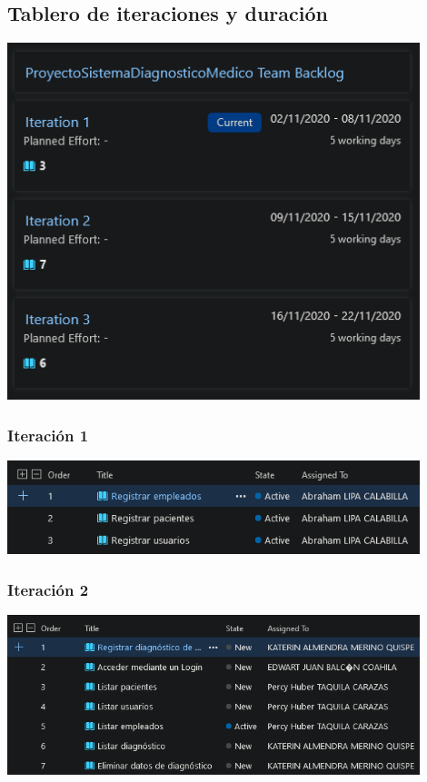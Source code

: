 \documentclass[preprint,12pt]{elsarticle}
\begin{document}
		\subsection{Tablero de iteraciones y duración}
	\begin{center}
		\includegraphics[width=12cm]{./imagen/Screenshot_4.png} 
	\end{center}
	\subsubsection{Iteración 1}
	\begin{center}
	\includegraphics[width=12cm]{./imagen/Screenshot_7.png} 
	\end{center}
	\subsubsection{Iteración 2}
	\begin{center}
	\includegraphics[width=12cm]{./imagen/Screenshot_6.png} 
	\end{center}
\end{document}
